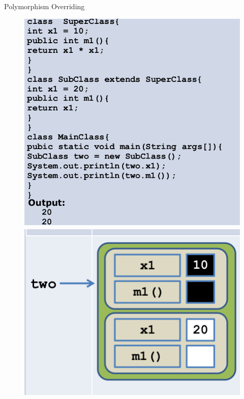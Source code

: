 \documentclass[14pt]{beamer}
\begin{document}
\begin{frame}[fragile]{Polymorphism}
 Overriding
 
 \begin{figure}[H]
\begin{minipage}[l]{0.5\linewidth}
\includegraphics[scale=.2]{polyoverride5.png}

\end{minipage}
\quad
\begin{minipage}[c]{0.3\textwidth}
\includegraphics[scale=.2]{polyoverride6.png}

\end{minipage}
\end{figure}
\end{frame}
\end{document}
